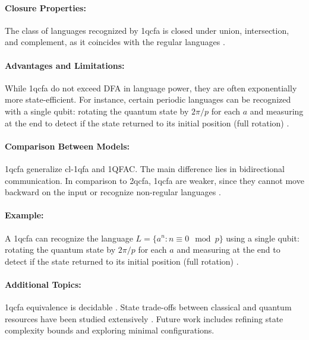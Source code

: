 \paragraph{Closure Properties:}  
The class of languages recognized by \gls{1qcfa} is closed under union, intersection, and complement, as it coincides with the regular languages \cite{li2015hybrid}.

\paragraph{Advantages and Limitations:}  
While \gls{1qcfa} do not exceed DFA in language power, they are often exponentially more state-efficient. For instance, certain periodic languages can be recognized with a single qubit: rotating the quantum state by $2\pi/p$ for each $a$ and measuring at the end to detect if the state returned to its initial position (full rotation) \cite{xiao2021state, bianchi2014size}.

\paragraph{Comparison Between Models:}  
\gls{1qcfa} generalize \gls{cl-1qfa} and 1QFAC. The main difference lies in bidirectional communication. In comparison to \gls{2qcfa}, \gls{1qcfa} are weaker, since they cannot move backward on the input or recognize non-regular languages \cite{li2015hybrid}.

\paragraph{Example:}  
A \gls{1qcfa} can recognize the language $L = \{ a^n : n \equiv 0 \mod p \}$ using a single qubit: rotating the quantum state by $2\pi/p$ for each $a$ and measuring at the end to detect if the state returned to its initial position (full rotation) \cite{bianchi2014power}.

\paragraph{Additional Topics:}  
\gls{1qcfa} equivalence is decidable \cite{li2015hybrid}. State trade-offs between classical and quantum resources have been studied extensively \cite{qiu2009equivalence, xiao2021state}. Future work includes refining state complexity bounds and exploring minimal configurations.


\subsubsection{}

